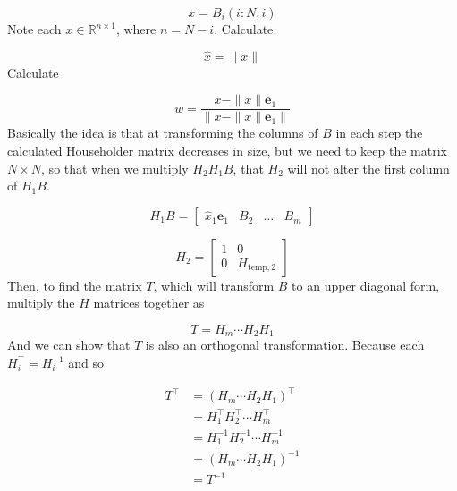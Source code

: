 \begin{equation*}
  x=B_{i}(i:N,i)
\end{equation*}
Note each $x\in\mathbb{R}^{n\times1}$, where $n=N-i$.
Calculate

\begin{equation*}
  \hat{x}=\|x\|
\end{equation*}
Calculate

\begin{equation*}
  w=\frac{x-\|x\|\mathbf{e}_{1}}{\|x-\|x\|\mathbf{e}_{1}\|}
\end{equation*}
Basically the idea is that at transforming the columns of $B$ in each step the calculated Householder matrix decreases in size, but we need to keep the matrix $N\times N$, so that when we multiply $H_{2}H_{1}B$, that $H_{2}$ will not alter the first column of $H_{1}B$.

\begin{equation*}
  H_{1}B=
  \begin{bmatrix}
    \hat{x}_{1}\mathbf{e}_{1} & B_{2} & \hdots & B_{m}
  \end{bmatrix}
\end{equation*}

\begin{equation*}
  H_{2}=
  \begin{bmatrix}
    1 & 0 \\
    0 & H_{\text{temp},2}
  \end{bmatrix}
\end{equation*}
Then, to find the matrix $T$, which will transform $B$ to an upper diagonal form, multiply the $H$ matrices together as

\begin{equation*}
  T=H_{m}\cdots H_{2}H_{1}
\end{equation*}
And we can show that $T$ is also an orthogonal transformation.
Because each $H_{i}^{\top}=H_{i}^{-1}$ and so

\begin{equation*}
  \begin{split}
    T^{\top}&=(H_{m}\cdots H_{2}H_{1})^{\top} \\
    &=H_{1}^{\top}H_{2}^{\top}\cdots H_{m}^{\top} \\
    &=H_{1}^{-1}H_{2}^{-1}\cdots H_{m}^{-1} \\
    &=(H_{m}\cdots H_{2}H_{1})^{-1} \\
    &=T^{-1}
  \end{split}
\end{equation*}

